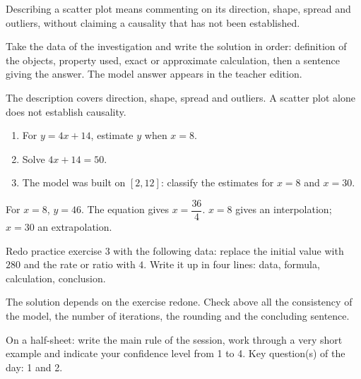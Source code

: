 \begin{summary}Describing a scatter plot means commenting on its direction, shape, spread and outliers, without claiming a causality that has not been established.\end{summary}

\begin{example}
Take the data of the investigation and write the solution in order: definition of the objects, property used, exact or approximate calculation, then a sentence giving the answer. The model answer appears in the teacher edition.
\end{example}
\begin{solution}The description covers direction, shape, spread and outliers. A scatter plot alone does not establish causality.\end{solution}

\begin{exercise}[essential]
\begin{enumerate}\item For $y=4x+14$, estimate $y$ when $x=8$.\item Solve $4x+14=50$.\item The model was built on $[2,12]$: classify the estimates for $x=8$ and $x=30$.\end{enumerate}
\end{exercise}
\begin{solution}For $x=8$, $y=46$. The equation gives $x=\dfrac{36}{4}$. $x=8$ gives an interpolation; $x=30$ an extrapolation.\end{solution}


\begin{homework}Redo practice exercise 3 with the following data: replace the initial value with $280$ and the rate or ratio with $4$. Write it up in four lines: data, formula, calculation, conclusion.\end{homework}
\begin{solution}The solution depends on the exercise redone. Check above all the consistency of the model, the number of iterations, the rounding and the concluding sentence.\end{solution}

\begin{exitticket}[3 minutes]On a half-sheet: write the main rule of the session, work through a very short example and indicate your confidence level from 1 to 4. Key question(s) of the day: 1 and 2.\end{exitticket}

